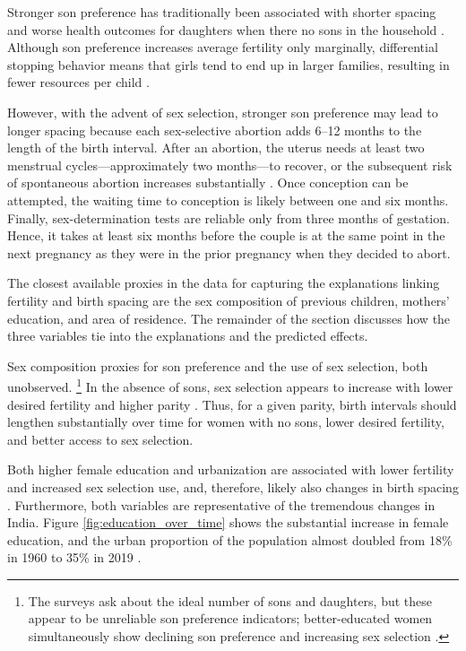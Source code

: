 \documentclass[12pt,letterpaper]{article}
\begin{document}
Stronger son preference has traditionally been associated with shorter spacing and worse
health outcomes for daughters when there no sons in the household
\citep{Whitworth2002,Jayachandran2011}.
Although son preference increases average fertility only marginally, differential stopping
behavior means that girls tend to end up in larger families, resulting in fewer resources
per child \citep{repetto72,clark00,Basu2010,Barcellos2014}.
 
However, with the advent of sex selection, stronger son preference may lead to longer
spacing because each sex-selective abortion adds 6–12 months to the length of the birth
interval.
After an abortion, the uterus needs at least two menstrual cycles---approximately 
two months---to recover, or the subsequent risk of spontaneous abortion increases 
substantially \citep{zhou00b}.
Once conception can be attempted, the waiting time to conception is likely between
one and six months. 
Finally, sex-determination tests are reliable only from three months of gestation. 
Hence, it takes at least six months before the couple is at the same point in the next 
pregnancy as they were in the prior pregnancy when they decided to abort.

The closest available proxies in the data for capturing the explanations linking
fertility and birth spacing are the sex composition of previous children, mothers'
education, and area of residence. 
The remainder of the section discusses how the three variables tie into the
explanations and the predicted effects.

Sex composition proxies for son preference and the use of
sex selection, both unobserved.%
\footnote{
The surveys ask about the ideal number of sons and 
daughters, but these appear to be unreliable son 
preference indicators; better-educated women simultaneously show 
declining son preference and increasing sex selection 
\citep{bhat03,pande07}.
} 
In the absence of sons, sex selection appears to increase 
with lower desired fertility and higher parity
\citep{Portner2015b,Jayachandran2017}. 
Thus, for a given parity, birth intervals should lengthen 
substantially over time for women with no sons, lower 
desired fertility, and better access to sex selection.

Both higher female education and urbanization are associated with 
lower fertility and increased sex selection use, and, therefore, likely also changes in birth spacing
\citep{das_gupta97,retherford03b,Portner2015b}.
Furthermore, both variables are representative of
the tremendous changes in India. 
Figure \ref{fig:education_over_time} shows the substantial increase in female education,
and the urban proportion of the population almost doubled from 18\% in 1960 to 35\% in 
2019 \citep{United-Nations2019}.
\end{document}
